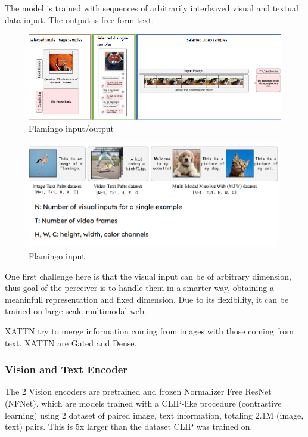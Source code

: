 The model is trained with sequences of arbitrarily interleaved visual and textual data input. The output is free form text.

\begin{figure}[H]
    \centering
    \includegraphics[width=1\linewidth]{tikz/Falingo input-output.png}
    \caption{Flamingo input/output}
    \label{fig:Flaming input/output}
\end{figure}

\begin{figure}[H]
    \centering
    \includegraphics[width=1\linewidth]{tikz/Flamingo Input.png}
    \caption{Flamingo input}
    \label{fig:Flamingo-input}
\end{figure}

One first challenge here is that the visual input can be of arbitrary dimension, thus goal of the perceiver is to handle them in a smarter way, obtaining a meaninfull representation and fixed dimension.  Due to its flexibility, it can be trained on large-scale multimodal web. 

XATTN try to merge information coming from images with those coming from text. XATTN are Gated and Dense.

\subsubsection{Vision and Text Encoder}

The 2 Vision encoders are pretrained and frozen  Normalizer Free ResNet (NFNet), which are models trained with a CLIP-like procedure (contrastive learning) using 2 dataset of paired image, text information, totaling 2.1M (image, text) pairs. This is 5x larger than the dataset CLIP was trained on.

